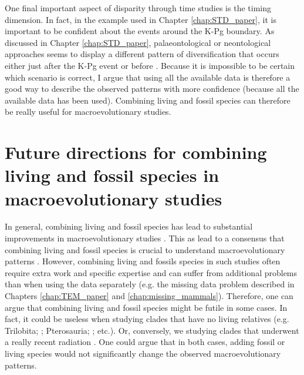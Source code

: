 One final important aspect of disparity through time studies is the timing dimension.
In fact, in the example used in Chapter \ref{chap:STD_paper}, it is important to be confident about the events around the K-Pg boundary.
As discussed in Chapter \ref{chap:STD_paper}, palaeontological or neontological approaches seems to display a different pattern of diversification that occurs either just after the K-Pg event \citep[suggesting an effect of K-Pg;][]{O'Leary08022013} or before \citep[rejecting an effect of K-Pg]{meredithimpacts2011,dosReis2014}.
Because it is impossible to be certain which scenario is correct, I argue that using all the available data \citep[both living and fossil][]{Slater2012MEE,beckancient2014} is therefore a good way to describe the observed patterns with more confidence (because all the available data has been used).
Combining living and fossil species can therefore be really useful for macroevolutionary studies.

\section{Future directions for combining living and fossil species in macroevolutionary studies}
In general, combining living and fossil species has lead to substantial improvements in macroevolutionary studies \citep{Finarelli2006,Slateretal2012,Slater2012MEE,SlaterPennel2014,pant2014complex,Mitchell2015}.
This as lead to a consensus that combining living and fossil species is crucial to understand macroevolutionary patterns \citep{jacksonwhat2006,quentaldiversity2010,dietlconservation2011,slaterunifying2013,fritzdiversity2013,benton2015}.
However, combining living and fossils species in such studies often require extra work and specific expertise \citep{ronquista2012} and can suffer from additional problems than when using the data separately (e.g. the missing data problem described in Chapters \ref{chap:TEM_paper} and \ref{chap:missing_mammals}).
Therefore, one can argue that combining living and fossil species might be futile in some cases.
In fact, it could be useless when studying clades that have no living relatives (e.g. Trilobita; \citealt{hopkinsdecoupling2013}; Pterosauria; \citealt{Butler2012}; etc.).
Or, conversely, we studying clades that underwent a really recent radiation \citep[e.g. Cichlidae][]{Genner01052007}.
One could argue that in both cases, adding fossil or living species would not significantly change the observed macroevolutionary patterns.

